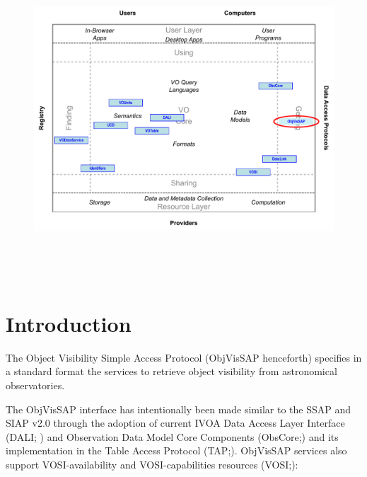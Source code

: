 \documentclass[11pt,a4paper]{ivoa}
\begin{document}

\begin{figure}[H]
\advance\leftskip 0.0in
\includegraphics[width=6.0in,height=4.73in]{./role_diagram.pdf}
\end{figure}


\pagebreak



\section{Introduction}\label{section:_Toc415497365}


The Object Visibility Simple Access Protocol (ObjVisSAP henceforth)
specifies in a standard format the services to retrieve object
visibility from astronomical observatories.



The ObjVisSAP interface has intentionally been made similar to the SSAP
\citep{2012ivoa.spec.0210T} and SIAP v2.0 \citep{2015ivoa.spec.0617D} through the adoption
of current IVOA Data Access Layer Interface (DALI; \citealt{2017ivoa.spec.0517D}) and Observation Data
Model Core Components (ObsCore;\citealt{2017ivoa.spec.0509L}) and its implementation in
the Table Access Protocol (TAP;\citealt{2019ivoa.spec.0927D}). ObjVisSAP services also support
VOSI-availability and VOSI-capabilities resources (VOSI;\citealt{2017ivoa.spec.0524G}):
\end{document}
